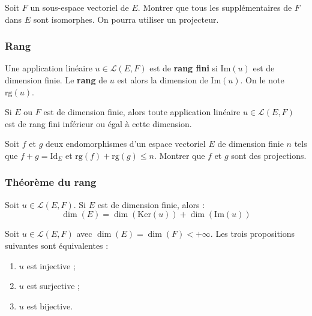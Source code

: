 \documentclass[french]{article}
\renewcommand{\ker}{\text{Ker}}
\newcommand{\rg}{\text{rg}}
\theoremstyle{plain}
\theoremstyle{definition}
\theoremstyle{remark}
\begin{document}
\begin{exo}
	Soit $F$ un sous-espace vectoriel de $E$. Montrer que tous les supplémentaires de $F$ dans $E$ sont isomorphes. On pourra utiliser un projecteur.
\end{exo}

\subsubsection*{Rang}

\begin{dfn}
	Une application linéaire $u\in\mathcal{L}(E,F)$ est de \textbf{rang fini} si $\text{Im}(u)$ est de dimension finie. Le \textbf{rang} de $u$ est alors la dimension de $\text{Im}(u)$. On le note $\rg(u)$.
\end{dfn}

\begin{prop}%
	Si $E$ ou $F$ est de dimension finie, alors toute application linéaire $u\in\mathcal{L}(E,F)$ est de rang fini inférieur ou égal à cette dimension.
\end{prop}

\begin{exo}
	Soit $f$ et $g$ deux endomorphismes d'un espace vectoriel $E$ de dimension finie $n$ tels que $f+g=\text{Id}_E$ et $\rg(f)+\rg(g)\leqslant n$. Montrer que $f$ et $g$ sont des projections.
\end{exo}

\subsubsection*{Théorème du rang}

\begin{thm}%
	Soit $u\in\mathcal{L}(E,F)$. Si $E$ est de dimension finie, alors : $$\dim(E)=\dim(\ker(u))+\dim(\text{Im}(u))$$
\end{thm}

\begin{cor}%
	Soit $u\in\mathcal{L}(E,F)$ avec $\dim(E)=\dim(F)<+\infty$. Les trois propositions suivantes sont équivalentes : 
	\begin{enumerate}[label=(\roman*)]
		\item $u$ est injective ;
		\item $u$ est surjective ;
		\item $u$ est bijective.
	\end{enumerate}
\end{cor}
\end{document}
